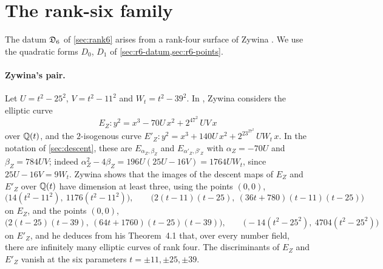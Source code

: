\section{The rank-six family}\label{sec:origin-r6}

The datum $\mathfrak D_6$ of \cref{sec:rank6} arises from a rank-four surface of Zywina \cite[\S6.5]{Zywina2026}. We use the quadratic forms $D_0$, $D_1$ of \cref{sec:r6-datum,sec:r6-points}.

\paragraph{Zywina's pair.} Let $U=t^2-25^2$, $V=t^2-11^2$ and $W_t=t^2-39^2$. In \cite[\S6.5]{Zywina2026}, Zywina considers the elliptic curve
\begin{equation}\label{r6o:zywina}
E_Z\colon y^2=x^3-70U\,x^2+2^47^2\,UV\,x
\end{equation}
over $\mathbb Q(t)$, and the $2$-isogenous curve $E'_Z\colon y^2=x^3+140U\,x^2+2^23^27^2\,UW_t\,x$. In the notation of \cref{sec:descent}, these are $E_{\alpha_Z,\beta_Z}$ and $E_{\alpha'_Z,\beta'_Z}$ with $\alpha_Z=-70U$ and $\beta_Z=784UV$; indeed $\alpha_Z^2-4\beta_Z=196U(25U-16V)=1764UW_t$, since $25U-16V=9W_t$. Zywina shows that the images of the descent maps of $E_Z$ and $E'_Z$ over $\mathbb Q(t)$ have dimension at least three, using the points $(0,0)$,
\[
\bigl(14(t^2-11^2),\ 1176(t^2-11^2)\bigr),\qquad \bigl(2(t-11)(t-25),\ (36t+780)(t-11)(t-25)\bigr)
\]
on $E_Z$, and the points $(0,0)$,
\[
\bigl(2(t-25)(t-39),\ (64t+1760)(t-25)(t-39)\bigr),\qquad \bigl(-14(t^2-25^2),\ 4704(t^2-25^2)\bigr)
\]
on $E'_Z$,
and he deduces from his Theorem~4.1 that, over every number field, there are infinitely many elliptic curves of rank four. The discriminants of $E_Z$ and $E'_Z$ vanish at the six parameters $t=\pm11,\pm25,\pm39$.

